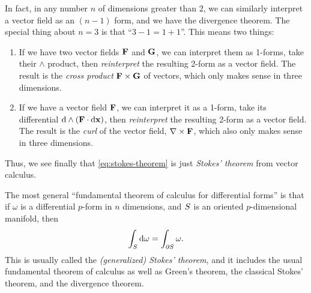 \documentclass[12pt]{amsart}
\begin{document}
In fact, in any number $n$ of dimensions greater than $2$, we can similarly interpret a vector field as an $(n-1)$ form, and we have the divergence theorem.
The special thing about $n=3$ is that ``$3-1 = 1+1$''.
This means two things:
\begin{enumerate}
\item If we have two vector fields $\mathbf{F}$ and $\mathbf{G}$, we can interpret them as 1-forms, take their $\wedge$ product, then \emph{reinterpret} the resulting 2-form as a vector field.
  The result is the \emph{cross product} $\mathbf{F} \times \mathbf{G}$ of vectors, which only makes sense in three dimensions.
\item If we have a vector field $\mathbf{F}$, we can interpret it as a 1-form, take its differential $\mathrm{d}\wedge(\mathbf{F} \cdot {\ensuremath{\mathrm{d} \mathbf{x}}})$, then \emph{reinterpret} the resulting 2-form as a vector field.
  The result is the \emph{curl} of the vector field, $\nabla \times \mathbf{F}$, which also only makes sense in three dimensions.
\end{enumerate}
Thus, we see finally that \cref{eq:stokes-theorem} is just \emph{Stokes' theorem} from vector calculus.

The most general ``fundamental theorem of calculus for differential forms'' is that if $\omega$ is a differential $p$-form in $n$ dimensions, and $S$ is an oriented $p$-dimensional manifold, then
\[ \int_{S} \mathrm{d}\omega = \int_{\partial S} \omega. \]
This is usually called the \emph{(generalized) Stokes' theorem}, and it includes the usual fundamental theorem of calculus as well as Green's theorem, the classical Stokes' theorem, and the divergence theorem.
\end{document}
